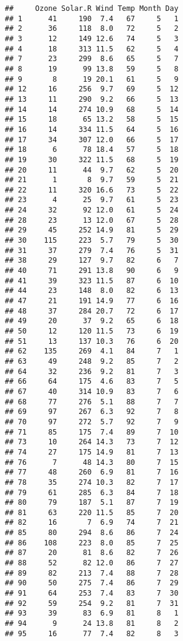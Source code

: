\documentclass[
]{article}
\begin{document}
\begin{verbatim}
##     Ozone Solar.R Wind Temp Month Day
## 1      41     190  7.4   67     5   1
## 2      36     118  8.0   72     5   2
## 3      12     149 12.6   74     5   3
## 4      18     313 11.5   62     5   4
## 7      23     299  8.6   65     5   7
## 8      19      99 13.8   59     5   8
## 9       8      19 20.1   61     5   9
## 12     16     256  9.7   69     5  12
## 13     11     290  9.2   66     5  13
## 14     14     274 10.9   68     5  14
## 15     18      65 13.2   58     5  15
## 16     14     334 11.5   64     5  16
## 17     34     307 12.0   66     5  17
## 18      6      78 18.4   57     5  18
## 19     30     322 11.5   68     5  19
## 20     11      44  9.7   62     5  20
## 21      1       8  9.7   59     5  21
## 22     11     320 16.6   73     5  22
## 23      4      25  9.7   61     5  23
## 24     32      92 12.0   61     5  24
## 28     23      13 12.0   67     5  28
## 29     45     252 14.9   81     5  29
## 30    115     223  5.7   79     5  30
## 31     37     279  7.4   76     5  31
## 38     29     127  9.7   82     6   7
## 40     71     291 13.8   90     6   9
## 41     39     323 11.5   87     6  10
## 44     23     148  8.0   82     6  13
## 47     21     191 14.9   77     6  16
## 48     37     284 20.7   72     6  17
## 49     20      37  9.2   65     6  18
## 50     12     120 11.5   73     6  19
## 51     13     137 10.3   76     6  20
## 62    135     269  4.1   84     7   1
## 63     49     248  9.2   85     7   2
## 64     32     236  9.2   81     7   3
## 66     64     175  4.6   83     7   5
## 67     40     314 10.9   83     7   6
## 68     77     276  5.1   88     7   7
## 69     97     267  6.3   92     7   8
## 70     97     272  5.7   92     7   9
## 71     85     175  7.4   89     7  10
## 73     10     264 14.3   73     7  12
## 74     27     175 14.9   81     7  13
## 76      7      48 14.3   80     7  15
## 77     48     260  6.9   81     7  16
## 78     35     274 10.3   82     7  17
## 79     61     285  6.3   84     7  18
## 80     79     187  5.1   87     7  19
## 81     63     220 11.5   85     7  20
## 82     16       7  6.9   74     7  21
## 85     80     294  8.6   86     7  24
## 86    108     223  8.0   85     7  25
## 87     20      81  8.6   82     7  26
## 88     52      82 12.0   86     7  27
## 89     82     213  7.4   88     7  28
## 90     50     275  7.4   86     7  29
## 91     64     253  7.4   83     7  30
## 92     59     254  9.2   81     7  31
## 93     39      83  6.9   81     8   1
## 94      9      24 13.8   81     8   2
## 95     16      77  7.4   82     8   3

\end{verbatim}
\end{document}
